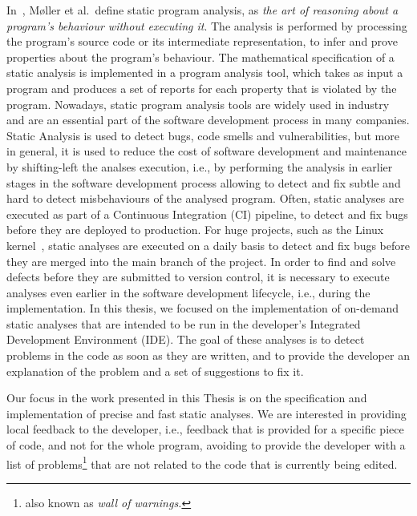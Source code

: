 In~\cite{spa}, M\o{}ller et al.~define static program analysis,
as \emph{the art of reasoning about a program's behaviour without executing it}. 
The analysis is performed by processing the program's source code or its 
intermediate representation, to infer and prove properties about the program's behaviour.
The mathematical specification of a static analysis is implemented in a program analysis tool, which
takes as input a program and produces a set of reports for each property that is violated by the program.
Nowadays, static program analysis tools are widely used in industry~\cite{piskachev2022far} and are an
essential part of the software development process in many companies. Static Analysis
is used to detect bugs, code smells and vulnerabilities, but more in general, it is used to
reduce the cost of software development and maintenance by shifting-left the analses execution, i.e., by
performing the analysis in earlier stages in the software development process allowing
to detect and fix subtle and hard to detect misbehaviours of the analysed program.
Often, static analyses are executed as part of a Continuous Integration (CI) pipeline, to
detect and fix bugs before they are deployed to production. For huge projects, such as
the Linux kernel~\cite{rusling1999linux}, static analyses are executed on a daily basis to detect
and fix bugs before they are merged into the main branch of the project.
In order to find and solve defects before they are submitted to version control,
it is necessary to execute analyses even earlier in the software development lifecycle, i.e., during the implementation.
In this thesis, we focused on the implementation of on-demand static analyses that are 
intended to be run in the developer's Integrated Development Environment (IDE).
The goal of these analyses is to detect problems in the code as soon as they are written,
and to provide the developer an explanation of the problem and a set of suggestions to fix it.

Our focus in the work presented in this Thesis is on the specification and implementation of
precise and fast static analyses. We are interested in providing local feedback 
to the developer, i.e., feedback that is provided for a specific piece of code, and not for the whole program, avoiding to 
provide the developer with a list of problems\footnote{also known as \emph{wall of warnings.}} 
that are not related to the code that is currently being edited.




